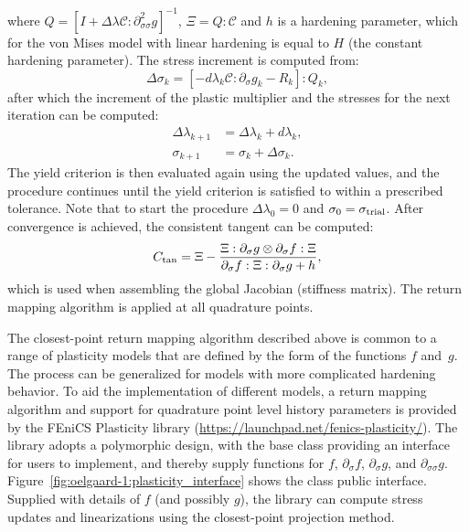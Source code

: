 %
where $Q = \left[I + \Delta \lambda \mathcal{C} : \partial^{2}_{\sigma
\sigma} g\right]^{-1}$, $\Xi = Q : \mathcal{C}$ and $h$ is a hardening
parameter, which for the von Mises model with linear hardening is equal
to $H$ (the constant hardening parameter).  The stress increment is
computed from:
%
\begin{equation}
\label{eq:oelgaard-1:rm_dsigma}
\Delta \sigma_{k} = \left[-d\lambda_{k} \mathcal{C} : \partial_{\sigma} g_{k}
- R_{k}\right] : Q_{k},
\end{equation}
%
after which the increment of the plastic multiplier and the stresses for the
next iteration can be computed:
%
\begin{align}
\label{eq:oelgaard-1:rm_update_values}
  \Delta \lambda_{k+1} &= \Delta \lambda_{k} + d \lambda_{k},
\\
  \sigma_{k+1} &= \sigma_{k} + \Delta \sigma_{k}.
\end{align}
%
The yield criterion is then evaluated again using the updated values,
and the procedure continues until the yield criterion is satisfied to
within a prescribed tolerance.  Note that to start the procedure $\Delta
\lambda_{0} = 0$ and $\sigma_{0} = \sigma_{\rm trial}$.  After convergence
is achieved, the consistent tangent can be computed:
%
\begin{equation}
\label{eq:oelgaard-1:rm_consistent_tangent}
C_{\rm tan} = \Xi - \frac{\Xi : \partial_{\sigma} g \otimes \partial_{\sigma} f : \Xi}
{\partial_{\sigma} f : \Xi : \partial_{\sigma} g + h},
\end{equation}
%
which is used when assembling the global Jacobian (stiffness matrix).
The return mapping algorithm is applied at all quadrature points.

The closest-point return mapping algorithm described above is common
to a range of plasticity models that are defined by the form of the
functions $f$ and~$g$. The process can be generalized for models with
more complicated hardening behavior.  To aid the implementation of
different models, a return mapping algorithm and support for quadrature
point level history parameters is provided by the FEniCS Plasticity
library (\url{https://launchpad.net/fenics-plasticity/}).  The library
adopts a polymorphic design, with the base class 
providing an interface for users to implement, and thereby supply
functions for
$f$,
$\partial_{\sigma} f$,
$\partial_{\sigma} g$,
and $\partial_{\sigma \sigma} g$.
Figure~\ref{fig:oelgaard-1:plasticity_interface} shows the
 class public interface.  Supplied with details
of $f$ (and possibly $g$), the library can compute stress updates and
linearizations using the closest-point projection method.

